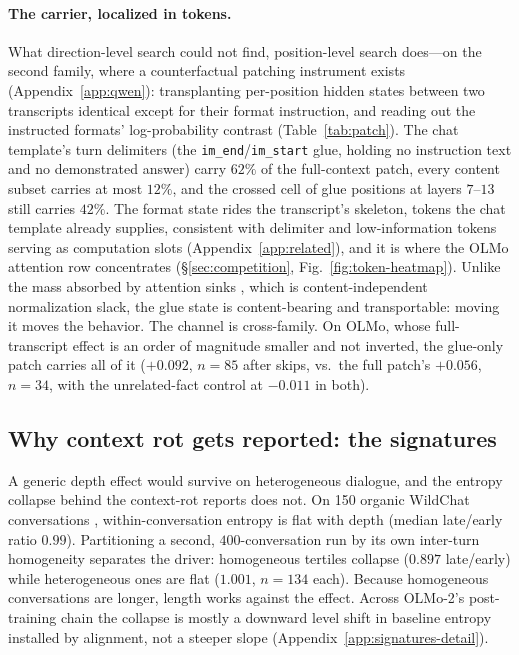 \documentclass{article}
\begin{document}
\paragraph{The carrier, localized in tokens.}
What direction-level search could not find, position-level search does---on the second family,
where a counterfactual patching instrument exists (Appendix~\ref{app:qwen}): transplanting
per-position hidden states between two transcripts identical except for their format
instruction, and reading out the instructed formats' log-probability contrast
(Table~\ref{tab:patch}). The chat template's turn delimiters (the
\texttt{im\_end}/\texttt{im\_start} glue, holding no instruction text and no demonstrated
answer) carry $62\%$ of the full-context patch, every content subset carries at most $12\%$,
and the crossed cell of glue positions at layers $7$--$13$ still carries $42\%$. The format
state rides the transcript's skeleton, tokens the chat template already supplies, consistent
with delimiter and low-information tokens serving as computation slots
(Appendix~\ref{app:related}), and it is where the OLMo attention row concentrates
(\S\ref{sec:competition}, Fig.~\ref{fig:token-heatmap}). Unlike the mass absorbed by attention
sinks \citep{xiao2023streamingllm,gu2024attentionsink}, which is content-independent
normalization slack, the glue state is content-bearing and transportable: moving it moves the
behavior. The channel is cross-family. On OLMo, whose full-transcript effect is an order of
magnitude smaller and not inverted, the glue-only patch carries all of it ($+0.092$, $n{=}85$
after skips, vs.\ the full patch's $+0.056$, $n{=}34$, with the unrelated-fact control at
$-0.011$ in both).

\subsection{Why context rot gets reported: the signatures}
\label{sec:signatures}

A generic depth effect would survive on heterogeneous dialogue, and the entropy collapse
behind the context-rot reports does not. On 150 organic WildChat conversations
\citep{zhao2024wildchat}, within-conversation entropy is flat with depth (median late/early
ratio $0.99$). Partitioning a second, $400$-conversation run by its
own inter-turn homogeneity separates the driver: homogeneous tertiles collapse ($0.897$
late/early) while heterogeneous ones are flat ($1.001$, $n{=}134$ each). Because homogeneous
conversations are longer, length works against the effect. Across OLMo-2's
\citep{olmo2024} post-training chain the collapse is mostly a downward level shift in
baseline entropy installed by alignment, not a steeper slope
(Appendix~\ref{app:signatures-detail}).
\end{document}
